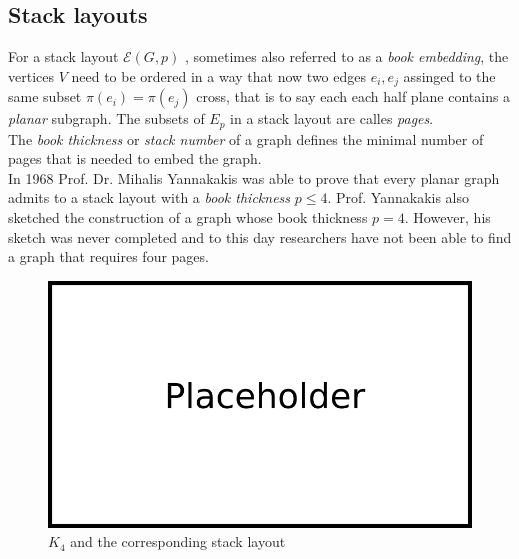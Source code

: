 \subsection{Stack layouts}
For a stack layout $\mathcal{E}(G,p)$ , sometimes also referred to as a \textit{book embedding}, the vertices $V$ need to be ordered in a way that now two edges $e_i, e_j$ assinged to the same subset $\pi(e_i) = \pi(e_j)$ cross, that is to say each each half plane contains a \textit{planar} subgraph. The subsets of $E_p$ in a stack layout are calles \textit{pages}.\\
The \textit{book thickness} or \textit{stack number} of a graph defines the minimal number of pages that is needed to embed the graph.\\
In 1968 Prof. Dr. Mihalis Yannakakis \cite{yannakakis1986four} was able to prove that every planar graph admits to a stack layout with a \textit{book thickness} $p \leq 4$. Prof. Yannakakis also sketched the construction of a graph whose book thickness $p = 4$. However, his sketch was never completed and to this day researchers have not been able to find a graph that requires four pages.
\begin{figure}[!h]
\begin{center}
\includegraphics[width=1\textwidth]{figures/Platzhalter.png}
\caption{$K_4$ and the corresponding stack layout}
\label{img:stackGHG}
\end{center}
\end{figure}
